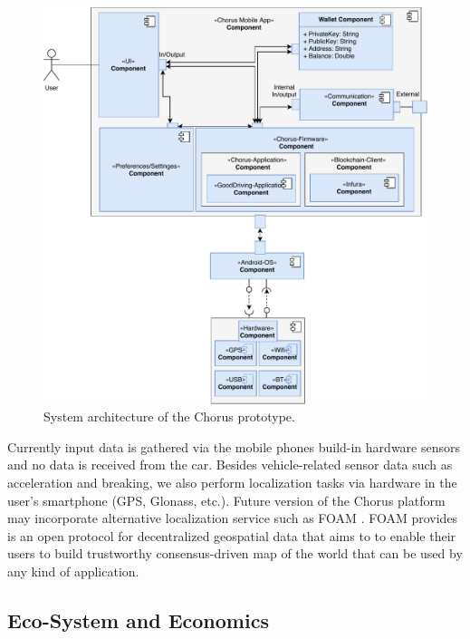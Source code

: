 \documentclass{llncs}
\begin{document}
{			\begin{figure}
				\centering
				\includegraphics[scale=0.65]{Figures/prototype-architecture/20180509_prototype-architecture-merge.pdf}
				\caption{System architecture of the Chorus prototype.}	
				\label{fig:prototype-system-architecture}
			\end{figure}
			

			Currently input data is gathered via the mobile phones build-in hardware sensors and no data is received from the car. Besides vehicle-related sensor data such as acceleration and breaking, we also perform localization tasks via hardware in the user's smartphone (GPS, Glonass, etc.). Future version of the Chorus platform may incorporate alternative localization service such as FOAM \cite{foamWhitepaper}. FOAM provides is an open protocol for decentralized geospatial data that aims to to enable their users to build trustworthy consensus-driven map of the world that can be used by any kind of application.


		\subsection{Eco-System and Economics}
			\label{ss:prototype-incentives}
		
}
\end{document}
